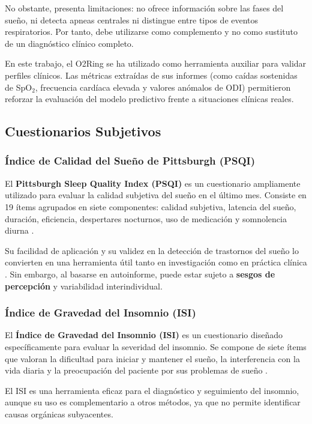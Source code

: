 No obstante, presenta limitaciones: no ofrece información sobre las fases del sueño, ni detecta apneas centrales ni distingue entre tipos de eventos respiratorios. Por tanto, debe utilizarse como complemento y no como sustituto de un diagnóstico clínico completo.

En este trabajo, el O2Ring se ha utilizado como herramienta auxiliar para validar perfiles clínicos. Las métricas extraídas de sus informes (como caídas sostenidas de SpO$_2$, frecuencia cardíaca elevada y valores anómalos de ODI) permitieron reforzar la evaluación del modelo predictivo frente a situaciones clínicas reales.


\subsection{Cuestionarios Subjetivos}

\subsubsection{Índice de Calidad del Sueño de Pittsburgh (PSQI)}

El \textbf{Pittsburgh Sleep Quality Index (PSQI)} es un cuestionario ampliamente utilizado para evaluar la calidad subjetiva del sueño en el último mes. Consiste en 19 ítems agrupados en siete componentes: calidad subjetiva, latencia del sueño, duración, eficiencia, despertares nocturnos, uso de medicación y somnolencia diurna \cite{buysse1989pittsburgh}.

Su facilidad de aplicación y su validez en la detección de trastornos del sueño lo convierten en una herramienta útil tanto en investigación como en práctica clínica \cite{mollayeva2016pittsburgh}. Sin embargo, al basarse en autoinforme, puede estar sujeto a \textbf{sesgos de percepción} y variabilidad interindividual.

\subsubsection{Índice de Gravedad del Insomnio (ISI)}
El \textbf{Índice de Gravedad del Insomnio (ISI)} es un cuestionario diseñado específicamente para evaluar la severidad del insomnio. Se compone de siete ítems que valoran la dificultad para iniciar y mantener el sueño, la interferencia con la vida diaria y la preocupación del paciente por sus problemas de sueño \cite{ISI}.

El ISI es una herramienta eficaz para el diagnóstico y seguimiento del insomnio, aunque su uso es complementario a otros métodos, ya que no permite identificar causas orgánicas subyacentes.

